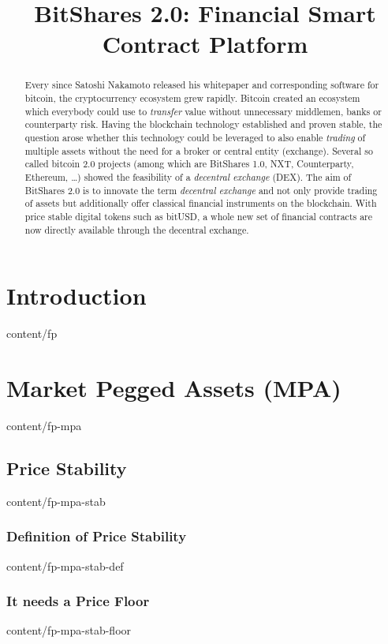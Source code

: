 \documentclass[conference,final,10pt,a4paper]{IEEEtran}
\title{BitShares 2.0: Financial Smart Contract Platform}
\begin{document}
\sloppy
\maketitle

\begin{abstract}

 Every since Satoshi Nakamoto released his whitepaper and corresponding
 software for bitcoin, the cryptocurrency ecosystem grew rapidly. Bitcoin
 created an ecosystem which everybody could use to \emph{transfer} value
 without unnecessary middlemen, banks or counterparty risk. Having the
 blockchain technology established and proven stable, the question arose
 whether this technology could be leveraged to also enable \emph{trading} of
 multiple assets without the need for a broker or central entity (exchange).
 Several so called bitcoin 2.0 projects (among which are BitShares 1.0, NXT,
 Counterparty, Ethereum, \dots) showed the feasibility of a \emph{decentral
 exchange} (DEX). The aim of BitShares 2.0 is to innovate the term
 \emph{decentral exchange} and not only provide trading of assets but
 additionally offer classical financial instruments on the blockchain. With
 price stable digital tokens such as bitUSD, a whole new set of financial
 contracts are now directly available through the decentral exchange.

\end{abstract}
\section        { Introduction                                    }  { content/fp                     } 

\section        { Market Pegged Assets (MPA)                       }  { content/fp-mpa                 } 
\subsection     { Price Stability                                  }  { content/fp-mpa-stab            } 
\subsubsection  { Definition of Price Stability                    }  { content/fp-mpa-stab-def        } 
\subsubsection  { It needs a Price Floor                           }  { content/fp-mpa-stab-floor      } 
\end{document}
